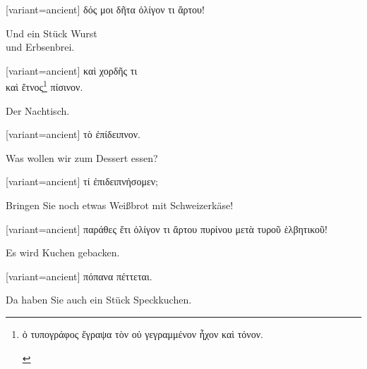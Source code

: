 \switchcolumn

\begin{greek}[variant=ancient]%
δός μοι δῆτα ὀλίγον τι ἄρτου!

\end{greek}%
\switchcolumn*

Und ein Stück Wurst\\
und Erbsenbrei.

\switchcolumn

\begin{greek}[variant=ancient]%
καὶ χορδῆς τι\\
καὶ ἔτνος\footnote{\begin{latin}%
\textgreek[variant=ancient]{ὁ τυπογράφος ἔγραψα τὸν οὐ γεγραμμένον
ἦχον καὶ τόνον.}\end{latin}%
} πίσινον.

\end{greek}%
\switchcolumn*

Der Nachtisch.

\switchcolumn

\begin{greek}[variant=ancient]%
τὸ ἐπίδειπνον.

\end{greek}%
\switchcolumn*

Was wollen wir zum Dessert essen?

\switchcolumn

\begin{greek}[variant=ancient]%
τί ἐπιδειπνήσομεν;

\end{greek}%
\switchcolumn*

Bringen Sie noch etwas Weißbrot mit Schweizerkäse!

\switchcolumn

\begin{greek}[variant=ancient]%
παράθες ἔτι ὀλίγον τι ἄρτου πυρίνου μετὰ τυροῦ ἑλβητικοῦ!

\end{greek}%
\switchcolumn*

Es wird Kuchen gebacken.

\switchcolumn

\begin{greek}[variant=ancient]%
πόπανα πέττεται.

\end{greek}%
\switchcolumn*

Da haben Sie auch ein Stück Speckkuchen.

\switchcolumn

